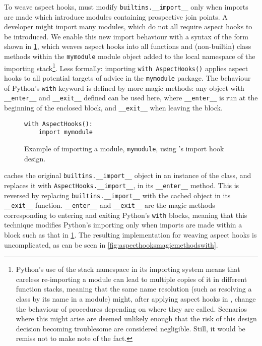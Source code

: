 To weave aspect hooks, \pdsf{} must modify \lstinline{builtins.__import__} only
when imports are made which introduce modules containing prospective join
points. A developer might import many modules, which do not all require aspect
hooks to be introduced. We enable this new import behaviour with a syntax of the
form shown in \cref{fig:simple_aspect_hook_weaving_example}, which weaves aspect
hooks into all functions and (non-builtin) class methods within the
\lstinline{mymodule} module object added to the local namespace of the importing
stack\footnote{Python's use of the stack namespace in its importing system means
that careless re-importing a module can lead to multiple copies of it in
different function stacks, meaning that the same name resolution (such as
resolving a class by its name in a module) might, after applying aspect hooks in
\pdsf{}, change the behaviour of procedures depending on where they are called.
Scenarios where this might arise are deemed unlikely enough that the risk of
this design decision becoming troublesome are considered negligible. Still, it
would be remiss not to make note of the fact.}. Less formally: importing
\lstinline{with AspectHooks()} applies aspect hooks to all potential targets of
advice in the \lstinline{mymodule} package. The behaviour of Python's
\lstinline{with} keyword is defined by more magic methods: any object with
\lstinline{__enter__} and \lstinline{__exit__} defined can be used here, where
\lstinline{__enter__} is run at the beginning of the enclosed block, and
\lstinline{__exit__} when leaving the block.

\begin{figure}[h]
    \begin{lstlisting}
with AspectHooks():
    import mymodule
    \end{lstlisting}
    \caption{Example of importing a module, \lstinline{mymodule}, using \pdsf{}'s import hook design.}
    \label{fig:simple_aspect_hook_weaving_example}
\end{figure}

\pdsf{} caches the original \lstinline{builtins.__import__} object in an
instance of the class, and replaces it with \lstinline{AspectHooks.__import__},
in its \lstinline{__enter__} method. This is reversed by replacing
\lstinline{builtins.__import__} with the cached object in its
\lstinline{__exit__} function. \lstinline{__enter__} and \lstinline{__exit__} are the
magic methods corresponding to entering and exiting Python's \lstinline{with} blocks, meaning
that this technique modifies Python's importing only when imports are made
within a block such as that in \cref{fig:simple_aspect_hook_weaving_example}.
The resulting implementation for weaving aspect
hooks is uncomplicated, as can be seen in \cref{fig:aspecthooksmagicmethodswith}.


